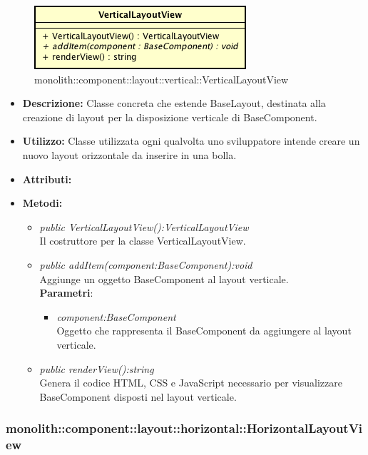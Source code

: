 \label{monolith::component::layout::vertical::VerticalLayoutView}
\begin{figure}[H]
	\centering
	\includegraphics[scale=0.5]{Sezioni/SottosezioniST/img/VerticalLayoutView.png}
	\caption{monolith::component::layout::vertical::VerticalLayoutView}
\end{figure}

\begin{itemize}
\item \textbf{Descrizione:} Classe concreta che estende BaseLayout, destinata alla creazione di layout per la disposizione verticale di BaseComponent.
\item \textbf{Utilizzo:} Classe utilizzata ogni qualvolta uno sviluppatore intende creare un nuovo layout orizzontale da inserire in una bolla.
\item \textbf{Attributi:}
\item \textbf{Metodi:}
\begin{itemize}
\item\textit{public VerticalLayoutView():VerticalLayoutView}\\
Il costruttore per la classe VerticalLayoutView.
\item \textit{public addItem(component:BaseComponent):void}\\
Aggiunge un oggetto BaseComponent al layout verticale.
\\ \textbf{Parametri}: \begin{itemize}
\item \textit{component:BaseComponent}\\
Oggetto che rappresenta il BaseComponent da aggiungere al layout verticale.
\end{itemize}
\item \textit{public renderView():string}\\
Genera il codice HTML, CSS e JavaScript necessario per visualizzare BaseComponent disposti nel layout verticale.
\end{itemize}
\end{itemize}

\subsubsection{monolith::component::layout::horizontal::HorizontalLayoutView}

